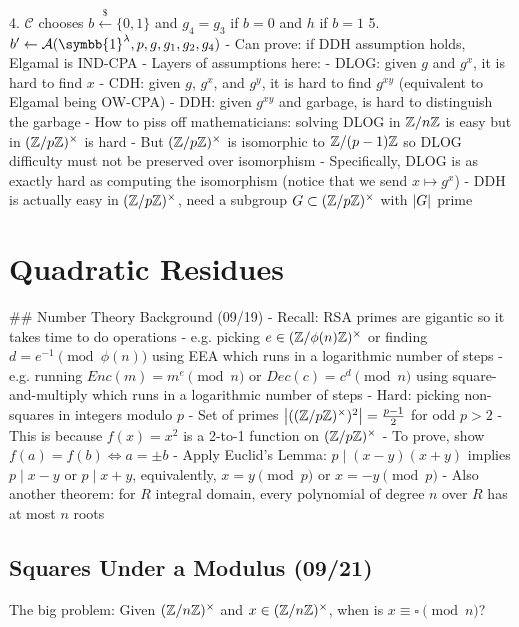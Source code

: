 \documentclass[notes]{agony}
\newcommand{\xgets}{\xleftarrow}
\newcommand{\ndgets}{\xgets{\mathdollar}}
\newcommand{\one}{\symbb{1}}
\begin{document}
\begin{markdown}
        4. $\mathcal C$ chooses $b \ndgets \{0,1\}$ and $g_4 = g_3$ if $b=0$ and $h$ if $b=1$
        5. $b' \gets \mathcal A(\one^\lambda,p,g,g_1,g_2,g_4)$
    - Can prove: if DDH assumption holds, Elgamal is IND-CPA
- Layers of assumptions here:
    - DLOG: given $g$ and $g^x$, it is hard to find $x$
    - CDH: given $g$, $g^x$, and $g^y$, it is hard to find $g^{xy}$ (equivalent to Elgamal being OW-CPA)
    - DDH: given $g^{xy}$ and garbage, is hard to distinguish the garbage
- How to piss off mathematicians: solving DLOG in $\mathbb{Z}/n\mathbb{Z}$ is easy but in $(\mathbb{Z}/p\mathbb{Z})^\times$ is hard
    - But $(\mathbb{Z}/p\mathbb{Z})^\times$ is isomorphic to $\mathbb{Z}/(p-1)\mathbb{Z}$ so DLOG difficulty must not be preserved over isomorphism
    - Specifically, DLOG is as exactly hard as computing the isomorphism (notice that we send $x \mapsto g^x$)
- DDH is actually easy in $(\mathbb{Z}/p\mathbb{Z})^\times$, need a subgroup $G \subset (\mathbb{Z}/p\mathbb{Z})^\times$ with $\abs{G}$ prime
\end{markdown}


\chapter{Quadratic Residues}

\begin{markdown}
## Number Theory Background (09/19)
- Recall: RSA primes are gigantic so it takes time to do operations
    - e.g. picking $e \in (\mathbb{Z}/\phi(n)\mathbb{Z})^\times$ or finding $d = e^{-1} \pmod{\phi(n)}$ using EEA which runs in a logarithmic number of steps
    - e.g. running $Enc(m) = m^e \pmod n$ or $Dec(c) = c^d \pmod n$ using square-and-multiply which runs in a logarithmic number of steps
- Hard: picking non-squares in integers modulo $p$
    - Set of primes $\abs{((\mathbb{Z}/p\mathbb{Z})^\times)^2} = \frac{p-1}{2}$ for odd $p > 2$
    - This is because $f(x) = x^2$ is a 2-to-1 function on $(\mathbb{Z}/p\mathbb{Z})^\times$
        - To prove, show $f(a) = f(b) \iff a = \pm b$
        - Apply Euclid's Lemma: $p \mid (x-y)(x+y)$ implies $p \mid x-y$ or $p \mid x+y$, equivalently, $x = y \pmod p$ or $x = -y \pmod p$
        - Also another theorem: for $R$ integral domain, every polynomial of degree $n$ over $R$ has at most $n$ roots
\end{markdown}

\section{Squares Under a Modulus (09/21)}
The big problem: Given $(\mathbb{Z}/n\mathbb{Z})^\times$ and $x \in (\mathbb{Z}/n\mathbb{Z})^\times$, when is $x \equiv \square \pmod n$?
\end{document}
